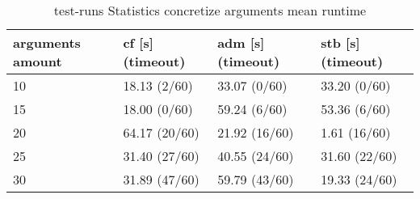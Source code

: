 \begin{table}[H]
    \centering
    \caption{test-runs Statistics concretize arguments mean runtime}
    \begin{tabular}{ |l|l|l|l| }
        \hline
            arguments amount & cf [s] (timeout)& adm [s] (timeout)& stb [s] (timeout)\\
        \hline
            10 & 18.13 \hfill (2/60)  &  33.07 \hfill (0/60)  &  33.20 \hfill (0/60) \\
            15 & 18.00 \hfill (0/60)  &  59.24 \hfill (6/60)  &  53.36 \hfill (6/60) \\
            20 & 64.17 \hfill (20/60) &  21.92 \hfill (16/60) &   1.61 \hfill (16/60) \\
            25 & 31.40 \hfill (27/60) &  40.55 \hfill (24/60) &  31.60 \hfill (22/60) \\
            30 & 31.89 \hfill (47/60) &  59.79 \hfill (43/60) &  19.33 \hfill (24/60) \\
        \hline
    \end{tabular}
\label{table:ExperimentStatisticsConcretize}
\end{table}

